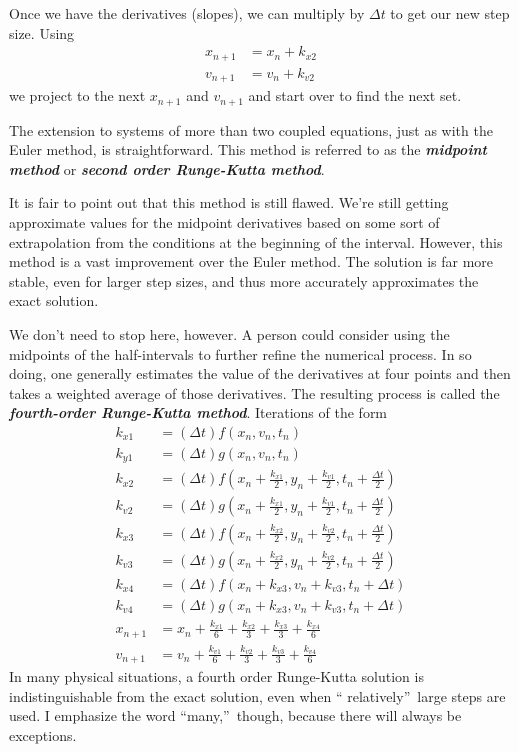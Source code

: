 \documentclass{book}
\begin{document}
Once we have the derivatives (slopes), we can multiply by $\Delta t$ to get
our new step size. Using
\begin{align*}
x_{n+1}  & =x_{n}+k_{x2}\\
v_{n+1}  & =v_{n}+k_{v2} \end{align*}
we project to the next $x_{n+1}$ and $v_{n+1}$ and start over to find the next set.

The extension to systems of more than two coupled equations, just as with the
Euler method, is straightforward. This method is referred to as the
\emph{\textbf{midpoint method}} or \emph{\textbf{second order Runge-Kutta
method}}.

It is fair to point out that this method is still flawed. We're still getting
approximate values for the midpoint derivatives based on some sort of
extrapolation from the conditions at the beginning of the interval. However,
this method is a vast improvement over the Euler method. The solution is far
more stable, even for larger step sizes, and thus more accurately approximates
the exact solution.

We don't need to stop here, however. A person could consider using the
midpoints of the half-intervals to further refine the numerical process. In so
doing, one generally estimates the value of the derivatives at four points and
then takes a weighted average of those derivatives. The resulting process is
called the \emph{\textbf{fourth-order Runge-Kutta method}}. Iterations of the
form
\begin{align*}
k_{x1}  & =(\Delta t)f(x_{n},v_{n},t_{n})\\
k_{y1}  & =(\Delta t)g(x_{n},v_{n},t_{n})\\
k_{x2}  & =(\Delta t)f\left(  x_{n}+\frac{k_{x1}}{2},y_{n}+\frac{k_{v1}} {2},t_{n}+\frac{\Delta t}{2}\right) \\
k_{v2}  & =(\Delta t)g\left(  x_{n}+\frac{k_{x1}}{2},y_{n}+\frac{k_{v1}} {2},t_{n}+\frac{\Delta t}{2}\right) \\
k_{x3}  & =(\Delta t)f\left(  x_{n}+\frac{k_{x2}}{2},y_{n}+\frac{k_{v2}} {2},t_{n}+\frac{\Delta t}{2}\right) \\
k_{v3}  & =(\Delta t)g\left(  x_{n}+\frac{k_{x2}}{2},y_{n}+\frac{k_{v2}} {2},t_{n}+\frac{\Delta t}{2}\right) \\
k_{x4}  & =(\Delta t)f(x_{n}+k_{x3},v_{n}+k_{v3},t_{n}+\Delta t)\\
k_{v4}  & =(\Delta t)g(x_{n}+k_{x3},v_{n}+k_{v3},t_{n}+\Delta t)\\
x_{n+1}  & =x_{n}+\frac{k_{x1}}{6}+\frac{k_{x2}}{3}+\frac{k_{x3}}{3} +\frac{k_{x4}}{6}\\
v_{n+1}  & =v_{n}+\frac{k_{v1}}{6}+\frac{k_{v2}}{3}+\frac{k_{v3}}{3} +\frac{k_{v4}}{6} 
\end{align*}
In many physical situations, a fourth order Runge-Kutta solution is
indistinguishable from the exact solution, even when \textquotedblleft
relatively\textquotedblright\ large steps are used. I emphasize the word
\textquotedblleft many,\textquotedblright\ though, because there will always
be exceptions.
\end{document}
